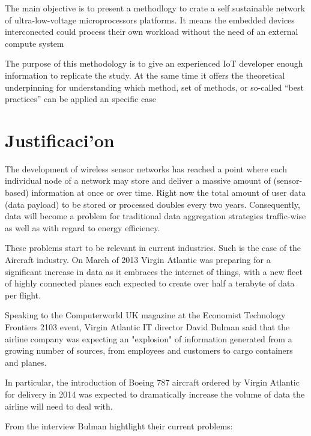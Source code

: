 The main objective is to present a methodlogy to crate a self sustainable
network of ultra-low-voltage microprocessors platforms. It means the embedded 
devices interconected could process their own workload without the need of an 
external compute system

The purpose of this methodology is to give an experienced IoT  developer 
enough information to replicate the study. At the same time it offers the theoretical 
underpinning for understanding which method, set of methods, or so-called “best 
practices” can be applied an specific case


\section{Justificaci'on}
\noindent

The development of wireless sensor networks has reached a point where each 
individual node of a network may store and deliver a massive amount of 
(sensor-based) information at once or over time. Right now the total amount of 
user data (data payload) to be stored or processed doubles every two years. Consequently,
data will become a problem for traditional data aggregation strategies 
traffic-wise as well as with regard to energy efficiency. 

These problems start to be relevant in current industries. Such is the case of 
the Aircraft industry. On March of 2013 Virgin Atlantic was preparing for a 
significant increase in data as it embraces the internet of things, with a new fleet of highly 
connected planes each expected to create over half a terabyte of data per flight.

Speaking to the Computerworld UK magazine at the Economist Technology Frontiers 2103 event, Virgin 
Atlantic IT director David Bulman said that the airline company was expecting an 
"explosion" of information generated from a growing number of sources, from 
employees and customers to cargo containers and planes.

In particular, the introduction of Boeing 787 aircraft ordered by Virgin 
Atlantic for delivery in 2014  was expected to dramatically increase the volume 
of data the airline will need to deal with.

From the interview Bulman hightlight their current problems: 


